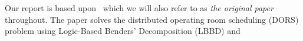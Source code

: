 Our report is based upon~\cite{roshanaei2017propagating} which we will also refer to as \textit{the original paper} throughout. The paper solves the distributed operating room scheduling (DORS) problem using Logic-Based Benders' Decomposition (LBBD) and